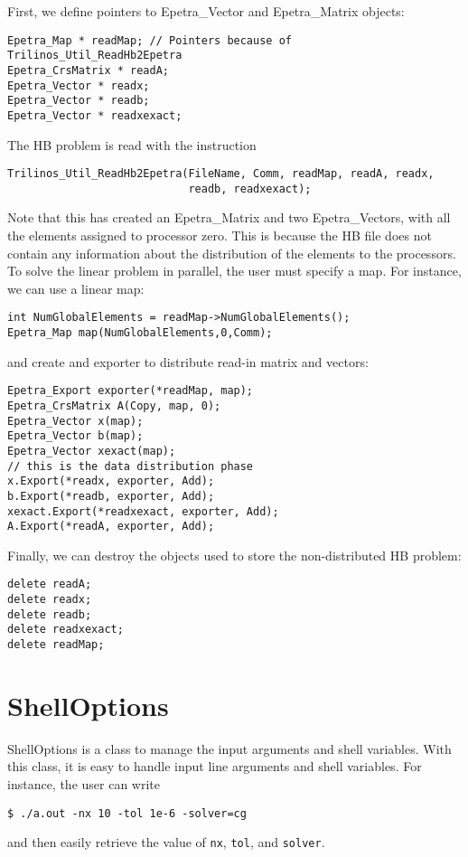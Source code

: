 First, we define pointers to Epetra\_Vector and Epetra\_Matrix objects:
\begin{verbatim}
Epetra_Map * readMap; // Pointers because of Trilinos_Util_ReadHb2Epetra
Epetra_CrsMatrix * readA; 
Epetra_Vector * readx; 
Epetra_Vector * readb;
Epetra_Vector * readxexact;
\end{verbatim}
The HB problem is read with the instruction
\begin{verbatim}
Trilinos_Util_ReadHb2Epetra(FileName, Comm, readMap, readA, readx, 
                            readb, readxexact);   
\end{verbatim}
Note that this has created an Epetra\_Matrix and two Epetra\_Vectors,
with all the elements assigned to processor zero. This is because the HB
file does not contain any information about the distribution of the
elements to the processors. To solve the linear problem in parallel, the
user must specify a map.  For instance, we can use a linear map:
\begin{verbatim}
int NumGlobalElements = readMap->NumGlobalElements();
Epetra_Map map(NumGlobalElements,0,Comm);
\end{verbatim}
and create and exporter to distribute read-in matrix and vectors:
\begin{verbatim}
Epetra_Export exporter(*readMap, map);
Epetra_CrsMatrix A(Copy, map, 0);
Epetra_Vector x(map);
Epetra_Vector b(map);
Epetra_Vector xexact(map);
// this is the data distribution phase
x.Export(*readx, exporter, Add);
b.Export(*readb, exporter, Add);
xexact.Export(*readxexact, exporter, Add);
A.Export(*readA, exporter, Add);
\end{verbatim}
Finally, we can destroy the objects used to store the non-distributed HB
problem:
\begin{verbatim}
delete readA;
delete readx;
delete readb;
delete readxexact;
delete readMap;
\end{verbatim}


\section{ShellOptions}

ShellOptions is a class to manage the input arguments and shell
variables.  With this class, it is easy to handle input line arguments
and shell variables. For instance, the user can write 
\begin{verbatim}
$ ./a.out -nx 10 -tol 1e-6 -solver=cg 
\end{verbatim}
and then easily retrieve the value of {\tt nx}, {\tt tol}, and {\tt solver}.
 

